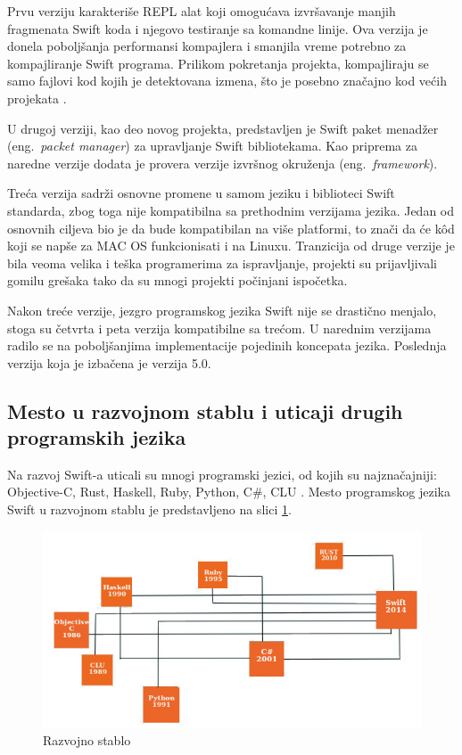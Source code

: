 \documentclass[a4paper]{article}
\begin{document}
Prvu verziju karakteriše REPL alat koji omogućava izvršavanje  manjih fragmenata Swift koda i njegovo testiranje sa komandne linije. Ova verzija je donela poboljšanja performansi kompajlera i smanjila vreme potrebno za kompajliranje Swift programa. Prilikom pokretanja projekta, kompajliraju se samo fajlovi kod kojih je detektovana izmena, što je posebno značajno kod većih projekata \cite{swiftdev_sajt}. 

U drugoj verziji, kao deo novog projekta, predstavljen je Swift paket menadžer (eng.~{\em packet manager}) za upravljanje Swift bibliotekama. Kao priprema za naredne verzije dodata je provera verzije izvršnog okruženja (eng.~{\em framework}). 

Treća verzija sadrži osnovne promene u samom jeziku i biblioteci Swift standarda, zbog toga nije kompatibilna sa prethodnim verzijama jezika. Jedan od osnovnih ciljeva bio je da bude kompatibilan na više platformi, to znači da će k\^{o}d koji se napše za MAC OS funkcionisati i na Linuxu. Tranzicija od druge verzije je bila veoma velika i teška programerima za ispravljanje, projekti su prijavljivali gomilu grešaka tako da su mnogi projekti počinjani ispočetka. 

Nakon treće verzije, jezgro programskog jezika Swift nije se drastično menjalo, stoga su četvrta i peta verzija kompatibilne sa trećom. U narednim verzijama radilo se na poboljšanjima implementacije pojedinih koncepata jezika. Poslednja verzija koja je izbačena je verzija 5.0.
  
\subsection{Mesto u razvojnom stablu i uticaji drugih programskih jezika}
\label{subsec:podnaslovRazvojnoStablo}
Na razvoj Swift-a uticali su mnogi programski jezici, od kojih su najznačajniji: Objective-C, Rust, Haskell, Ruby, Python, C\#, CLU \cite{chris_sajt}. Mesto programskog jezika Swift u razvojnom stablu je predstavljeno na slici \ref{fig:razvojno_stablo}.

\begin{figure}[h!]
\begin{center}
\includegraphics[scale=0.5]{razvojno_stablo.jpg}
\end{center}
\caption{Razvojno stablo}
\label{fig:razvojno_stablo}
\end{figure}
\end{document}

